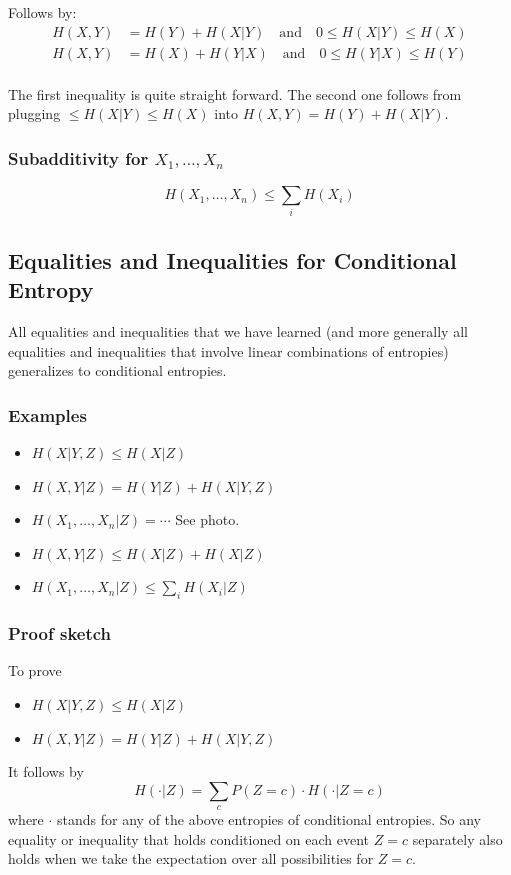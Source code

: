 \documentclass{article}
\begin{document}
Follows by:
\begin{align*}
    H(X,Y) &= H(Y) + H(X|Y) \quad \text{and}\quad 0\leq H(X|Y) \leq H(X)\\
    H(X,Y) &= H(X) + H(Y|X) \quad \text{and}\quad 0\leq H(Y|X) \leq H(Y)\\
\end{align*}

The first inequality is quite straight forward. The second one follows from plugging $\leq H(X|Y) \leq H(X)$ into $H(X,Y) = H(Y) + H(X|Y)$.

\subsubsection{Subadditivity for $X_1,\ldots, X_n$}

\[
H(X_1,\ldots,X_n)\leq \sum_i H(X_i)
\]

\subsection{Equalities and Inequalities for Conditional Entropy}

All equalities and inequalities that we have learned (and more generally all equalities and inequalities that involve linear combinations of entropies) generalizes to conditional entropies.

\subsubsection{Examples}

\begin{itemize}
    \item $H(X|Y,Z)\leq H(X|Z)$
    \item $H(X,Y|Z) = H(Y|Z) + H(X|Y,Z)$
    \item $H(X_1,\ldots,X_n|Z)= \cdots$ See photo.
    \item $H(X,Y|Z) \leq H(X|Z) + H(X|Z)$
    \item $H(X_1,\ldots, X_n| Z)\leq \sum_i H(X_i|Z)$
\end{itemize}

\subsubsection{Proof sketch}
To prove 
\begin{itemize}
    \item $H(X|Y,Z)\leq H(X|Z)$
    \item $H(X,Y|Z) = H(Y|Z) + H(X|Y,Z)$
\end{itemize}
It follows by 
\[
H(\cdot | Z) = \sum_c P(Z=c)\cdot H(\cdot | Z=c)
\]
where $\cdot$ stands for any of the above entropies of conditional entropies. So any equality or inequality that holds conditioned on each event $Z=c$ separately also holds when we take the expectation over all possibilities for $Z=c$.
\end{document}
